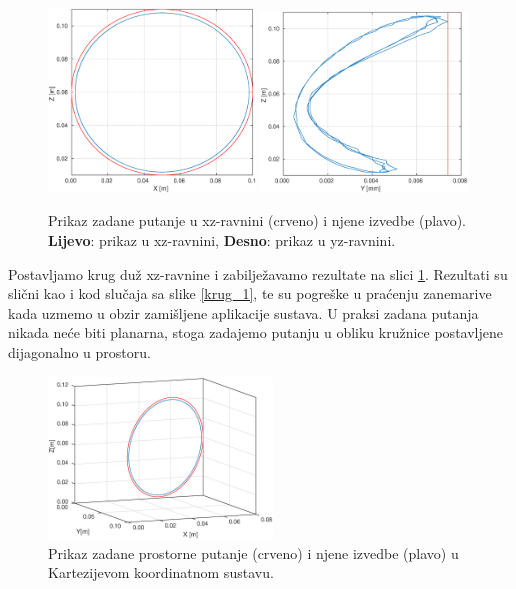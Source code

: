 \documentclass[times, utf8, diplomski, numeric]{fer}
\begin{document}
\begin{figure}[h!]
\centering
\includegraphics[width=0.49\textwidth]{xz_krug2}
\includegraphics[width=0.49\textwidth]{yz_krug2}
\caption{Prikaz zadane putanje u xz-ravnini (crveno) i njene izvedbe (plavo). \textbf{Lijevo}: prikaz u xz-ravnini, \textbf{Desno}: prikaz u yz-ravnini.} \label{krug_2}
\end{figure}
Postavljamo krug duž xz-ravnine i zabilježavamo rezultate na slici \ref{krug_2}.
Rezultati su slični kao i kod slučaja sa slike \ref{krug_1}, te su pogreške u praćenju zanemarive kada uzmemo u obzir zamišljene aplikacije sustava.
U praksi zadana putanja nikada neće biti planarna, stoga zadajemo putanju u obliku kružnice postavljene dijagonalno u prostoru.
\begin{figure}[h!]
\centering
\includegraphics[width=0.53\textwidth]{xyz_krug3}
\caption{Prikaz zadane prostorne putanje  (crveno) i njene izvedbe (plavo) u Kartezijevom koordinatnom sustavu.} \label{krug_3}
\end{figure}
\end{document}
